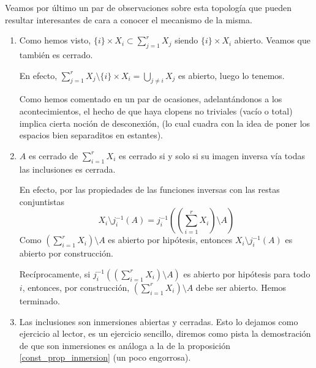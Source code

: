 \begin{obs}
	Veamos por último un par de observaciones sobre esta topología que pueden resultar interesantes de cara a conocer el mecanismo de la misma.
	\begin{enumerate}
	\item Como hemos visto, $\{i\}\times X_i\subset\sum_{j=1}^r X_j$ siendo $\{i\}\times X_i$ abierto. Veamos que también es cerrado.
	
	En efecto, $\sum_{j=1}^r X_j\setminus \{i\}\times X_i=\bigcup_{j\ne i }X_j$ es abierto, luego lo tenemos.
	
	Como hemos comentado en un par de ocasiones, adelantándonos a los acontecimientos, el hecho de que haya clopens no triviales (vacío o total) implica cierta noción de desconexión, (lo cual cuadra con la idea de poner los espacios bien separaditos en estantes).
	\item $A$ es cerrado de $\sum_{i=1}^rX_i$ es cerrado si y solo si su imagen inversa vía todas las inclusiones es cerrada.
	
	En efecto, por las propiedades de las funciones inversas con las restas conjuntistas
	\[X_i\setminus j_i^{-1}(A) = j_i^{-1}\left(\left(\sum_{i=1}^rX_i\right)\setminus A\right)\]
	Como $(\sum_{i=1}^rX_i)\setminus A$ es abierto por hipótesis, entonces $X_i\setminus j_i^{-1}(A)$ es abierto por construcción.
	
	Recíprocamente, si $j_i^{-1}\left(\left(\sum_{i=1}^rX_i\right)\setminus A\right)$ es abierto por hipótesis para todo $i$, entonces, por construcción, $(\sum_{i=1}^rX_i)\setminus A$ debe ser abierto. Hemos terminado.  
	\item Las inclusiones son inmersiones abiertas y cerradas. Esto lo dejamos como ejercicio al lector, es un ejercicio sencillo, diremos como pista la demostración de que son inmersiones es análoga a la de la proposición \ref{const_prop_inmersion} (un poco engorrosa). \qedhere
\end{enumerate}
\end{obs}
